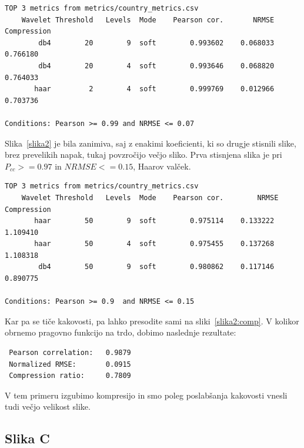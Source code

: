 \documentclass[a4paper,11pt]{article}
\begin{document}
\begin{verbatim}
TOP 3 metrics from metrics/country_metrics.csv
	Wavelet	Threshold	Levels	Mode	Pearson cor.	   NRMSE 	Compression
	    db4	       20	     9	soft	    0.993602 	0.068033	   0.766180
	    db4	       20	     4	soft	    0.993646 	0.068820	   0.764033
	   haar	        2	     4	soft	    0.999769 	0.012966	   0.703736

Conditions: Pearson >= 0.99	and	NRMSE <= 0.07
\end{verbatim}

Slika~\ref{slika2} je bila zanimiva, saj z enakimi koeficienti, ki so drugje stisnili slike, brez prevelikih napak, tukaj povzročijo večjo sliko. Prva stisnjena slika je pri $P_{cc} >= 0.97$ in $NRMSE <= 0.15$, Haarov valček. 
\begin{verbatim}
TOP 3 metrics from metrics/country_metrics.csv
	Wavelet	Threshold	Levels	Mode	Pearson cor.	    NRMSE	Compression
	   haar	       50	     9	soft	    0.975114 	0.133222	   1.109410
	   haar	       50	     4	soft	    0.975455 	0.137268	   1.108318
	    db4	       50	     9	soft	    0.980862 	0.117146	   0.890775

Conditions: Pearson >= 0.9	and	NRMSE <= 0.15
\end{verbatim}
Kar pa se tiče kakovosti, pa lahko presodite sami na sliki~\ref{slika2:comp}. V kolikor obrnemo pragovno funkcijo na trdo, dobimo naslednje rezultate:
\begin{verbatim}
 Pearson correlation:	0.9879
 Normalized RMSE:		0.0915
 Compression ratio:		0.7809
\end{verbatim}
V tem primeru izgubimo kompresijo in smo poleg poslabšanja kakovosti vnesli tudi večjo velikost slike.


\subsection{Slika C}
\end{document}
